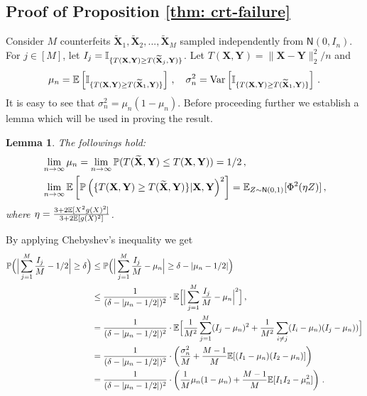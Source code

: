 \documentclass[11pt]{article}
\newtheorem{lemma}[propo]{Lemma}
\def\bX{\mathbf{X}}
\def\bY{\mathbf{Y}}
\def\normal{\mathsf{N}}
\def\tbX{\widetilde{\bX}}
\begin{document}
\subsection{Proof of Proposition \ref{thm: crt-failure}} \label{proof:thm: crt-failure}
\def\tbX{\widetilde{\bX}}
 Consider $M$ counterfeits $\tbX_1,\tbX_2,...,\tbX_M$ sampled independently from $\normal(0,I_n)$. For $ j\in [M]$, let $I_j= \ind_{\{T(\bX,\bY)  \geq T(\tbX_j,\bY)\}} $. Let $T(\bX,\bY)=\|\bX-\bY\|_2^2/n$ and
 \[
 \mu_n=\E\left[ \ind_{ \{T(\bX,\bY) \geq T(\tbX_1,\bY) \}}  \right]\,,\quad \sigma_n^2=\var\left[  \ind_{\{T(\bX,\bY) \geq T(\tbX_1,\bY)\} } \right]\,.
 \]
It is easy to see that $\sigma_n^2=\mu_n(1-\mu_n)$. Before proceeding further we establish a lemma which will be used in proving the result.
%
\begin{lemma}\label{lemma: crt-fails0}
The followings hold:
\begin{align*}
&\lim_{n\to\infty} \mu_n =  \lim\limits_{n\rightarrow \infty}^{}\prob(T(\tbX,\bY) \leq T(\bX,\bY)) =1/2 \,,\\
&\lim\limits_{n\rightarrow \infty}^{}\E \left[\prob\left( \{T(\bX,\bY)\geq T(\tbX,\bY)\}|\bX,\bY \right)^2 \right] = \E_{Z\sim\normal(0,1)}[ \Phi^2(\eta Z) ] \,,
\end{align*}
where $\eta= \frac{3+2{\mathbb E}[X^2g(X)^2]}{3+2{\mathbb E}[g(X)^2]}$.
\end{lemma}
%
By applying Chebyshev's inequality we get
%
\begin{align}
{\mathbb P}\Big( \Big| \sum\limits_{j=1}^{M}\frac{I_j}{M} -1/2  \Big| \geq \delta \Big) &\leq  {\mathbb P}\Big( \Big| \sum\limits_{j=1}^{M}\frac{I_j}{M} -\mu_n  \Big| \geq \delta-|\mu_n-1/2| \Big) \nonumber\\
 &\leq \frac{1}{(\delta-|\mu_n-1/2|)^2}\cdot{\mathbb E}\Big[  \Big| \sum\limits_{j=1}^{M} \frac{I_j}{M}-\mu_n   \Big|^2  \Big]\,,\nonumber\\
&=\frac{1}{(\delta-|\mu_n-1/2|)^2}\cdot{\mathbb E}\Big[ \frac{1} {M^2} \sum\limits_{j=1}^{M} (I_j-\mu_n)^2 + \frac{1}{M^2}\sum_{i\neq j}(I_i-\mu_n)(I_j-\mu_n)) \Big]\nonumber\\
&= \frac{1}{(\delta-|\mu_n-1/2|)^2}\cdot\left( \frac{\sigma_n^2}{M}+\frac{M-1}{M}{\mathbb E} [ (I_1-\mu_n)(I_2-\mu_n) ] \right)\nonumber \\
&=\frac{1}{(\delta-|\mu_n-1/2|)^2}\cdot\left( \frac{1}{M}\mu_n(1-\mu_n)+\frac{M-1}{M}{\mathbb E} [ I_1I_2-\mu_n^2 ] \right)\,. \label{eq: tmp2} 
\end{align}
\end{document}
